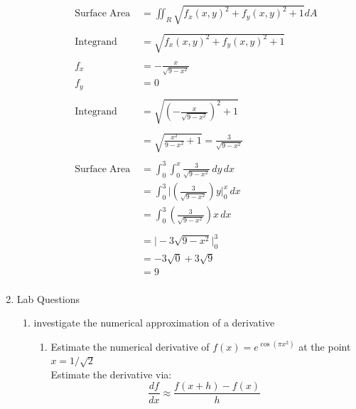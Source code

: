 \documentclass[a4paper,11pt]{article}
\begin{document}
\begin{preview}
\begin{enumerate}
\begin{enumerate}
        \begin{align*}
            \mathrm{Surface \; Area \;} &= \iint_R \sqrt{ f_x(x,y)^2 + f_y(x,y)^2 +1} dA\\\\
            \mathrm{Integrand} &= \sqrt{ f_x(x,y)^2 + f_y(x,y)^2 +1}\\\\
            f_x &= -\frac{x}{\sqrt{9 - x^2}}\\
            f_y &= 0 \\\\
            \mathrm{Integrand} &= \sqrt{ \left(-\frac{x}{\sqrt{9 - x^2}}\right)^2 +1}\\\\
            &= \sqrt{ \frac{x^2}{9-x^2} +1} = \frac{3}{\sqrt{9-x^2}}\\\\
            \mathrm{Surface \; Area \;} &= \int_{0}^{3} \int_{0}^{x} \frac{3}{\sqrt{9-x^2}} \,dy  \,dx \\ 
            &= \int_{0}^{3} \Big| \left( \frac{3}{\sqrt{9-x^2}} \right) y \Big|_{0}^{x}  \,dx \\
            &= \int_{0}^{3} \left( \frac{3}{\sqrt{9-x^2}} \right) x  \,dx \\\\
            &= \Big| -3\sqrt{9-x^2} \Big|_{0}^{3}\\
            &= -3\sqrt{0} + 3\sqrt{9}\\
            &= 9\\
        \end{align*}
    \end{enumerate}

    \item Lab Questions
    
    \begin{enumerate}
        \item investigate the numerical approximation of a derivative
        \begin{enumerate}
            \item Estimate the numerical derivative of $f(x) = e^{\cos(\pi x^2)}$ at the point $x = 1/\sqrt{2}$ \\
            Estimate the derivative via: $$ \frac{df}{dx} \approx \frac{f(x +h) - f(x)}{h}$$
            

\end{enumerate}
\end{enumerate}
\end{enumerate}
\end{preview}
\end{document}
